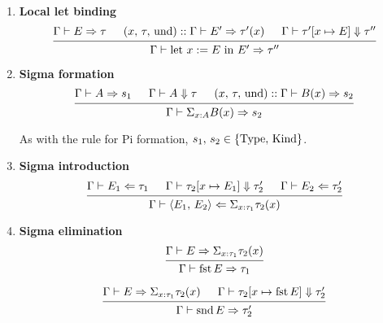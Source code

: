 \documentclass{article}
\begin{document}
\begin{definition} 
\begin{enumerate}
  \item \textbf{Local let binding} \\
    \[
      \begin{prooftree}
        \hypo{\Gamma \vdash E \Rightarrow \tau}
        \hypo{(x, \, \tau, \, \text{und}) :: \Gamma \vdash E' \Rightarrow \tau'(x)}
        \hypo{\Gamma \vdash \tau'[x \mapsto E] \Downarrow \tau''}
        \infer3{\Gamma \vdash \text{let } x := E \text{ in } E' \Rightarrow \tau''}
      \end{prooftree}
    \]

  \item \textbf{Sigma formation} \\
    \[
      \begin{prooftree}
        \hypo{\Gamma \vdash A \Rightarrow s_1}
        \hypo{\Gamma \vdash A \Downarrow \tau}
        \hypo{(x, \, \tau, \, \text{und}) :: \Gamma \vdash B(x) \Rightarrow s_2}
        \infer3{\Gamma \vdash \Sigma_{x : A}B(x) \Rightarrow s_2}
      \end{prooftree}
    \]

    As with the rule for Pi formation, $s_1, \, s_2 \in \{\operatorname{Type}, \, \operatorname{Kind}\}$.

  \item \textbf{Sigma introduction} \\
    \[
      \begin{prooftree}
        \hypo{\Gamma \vdash E_1 \Leftarrow \tau_1}
        \hypo{\Gamma \vdash \tau_2[x \mapsto E_1] \Downarrow \tau_2'}
        \hypo{\Gamma \vdash E_2 \Leftarrow \tau_2'}
        \infer3{\Gamma \vdash \langle  E_1, \, E_2 \rangle \Leftarrow 
          \Sigma_{x : \tau_1}\tau_2(x)}
      \end{prooftree}
    \]
   
  \item \textbf{Sigma elimination} \\
    \[
      \begin{prooftree}
        \hypo{\Gamma \vdash E \Rightarrow \Sigma_{x : \tau_1}\tau_2(x)}
        \infer1{\Gamma \vdash \fst E \Rightarrow \tau_1}
      \end{prooftree}
    \]

    \[
      \begin{prooftree}
        \hypo{\Gamma \vdash E \Rightarrow \Sigma_{x : \tau_1}\tau_2(x)}
        \hypo{\Gamma \vdash \tau_2[x \mapsto \fst E] \Downarrow \tau_2'}
        \infer2{\Gamma \vdash \snd E \Rightarrow \tau_2'}
      \end{prooftree}
    \]


\end{enumerate}
\end{definition}
\end{document}
